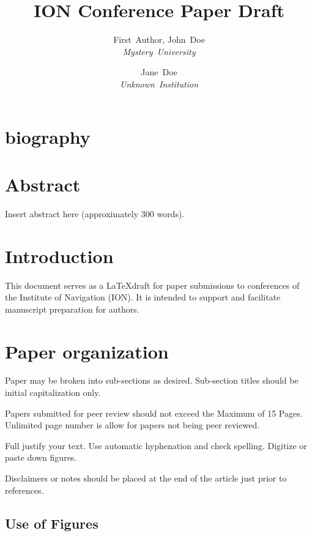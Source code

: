 \documentclass[letterpaper,times]{IONconf}
\title{ION Conference Paper Draft}
\author{
    First~Author, John~Doe\\ \textit{Mystery~University}
    \and Jane~Doe\\ \textit{Unknown~Institution}
    }
\begin{document}
\maketitle

\section*{biography}





\section*{Abstract}

Insert abstract here (approximately 300 words).


\section{Introduction}

This document serves as a \LaTeX  draft for paper submissions to conferences of the Institute of Navigation (ION). It is intended to support and facilitate manuscript preparation for authors.


\section{Paper organization}

Paper may be broken into sub-sections as desired. Sub-section titles should be initial capitalization only.

Papers submitted for peer review should not exceed the Maximum of 15 Pages. Unlimited page number is allow for papers not being peer reviewed.

Full justify your text. Use automatic hyphenation and check spelling. Digitize or paste down figures.

Disclaimers or notes should be placed at the end of the article just prior to references.

\subsection{Use of Figures}
\end{document}
